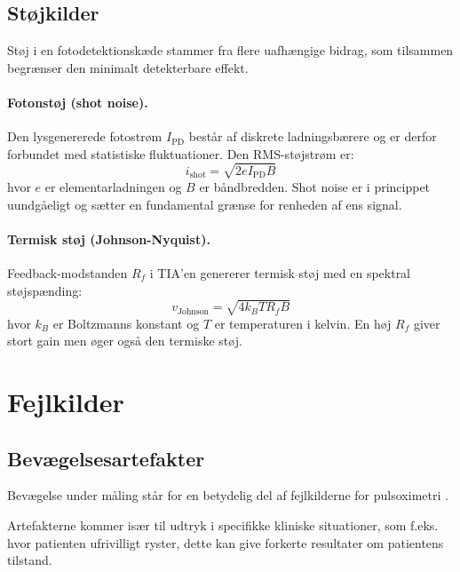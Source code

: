 \subsection{Støjkilder}
\label{sec:støjkilder}

Støj i en fotodetektionskæde stammer fra flere uafhængige bidrag, som tilsammen begrænser den minimalt detekterbare effekt.

\paragraph{Fotonstøj (shot noise).} Den lysgenererede fotostrøm $I_{\mathrm{PD}}$ består af diskrete ladningsbærere og er derfor forbundet med statistiske fluktuationer. 
Den RMS-støjstrøm er:
\begin{equation}
    i_{\mathrm{shot}} = \sqrt{2 e I_{\mathrm{PD}} B}
    \label{eq:shot_noise}
\end{equation}
hvor $e$ er elementarladningen og $B$ er båndbredden. Shot noise er i princippet uundgåeligt og sætter en fundamental grænse for renheden af ens signal.

\paragraph{Termisk støj (Johnson-Nyquist).} Feedback-modstanden $R_f$ i TIA'en 
genererer termisk støj med en spektral støjspænding:
\begin{equation}
    v_{\mathrm{Johnson}} = \sqrt{4 k_B T R_f B}
    \label{eq:johnson_noise}
\end{equation}
hvor $k_B$ er Boltzmanns konstant og $T$ er temperaturen i kelvin. En høj $R_f$ giver stort gain men øger også den termiske støj.

\section{Fejlkilder}
\label{sec:fejlkilder}

  \subsection{Bevægelsesartefakter}

Bevægelse under måling står for en betydelig del af fejlkilderne for pulsoximetri \cite{Petterson2007}. 

Artefakterne kommer især til udtryk i specifikke kliniske situationer, som f.eks. hvor patienten ufrivilligt ryster, dette kan give forkerte resultater om patientens tilstand.

